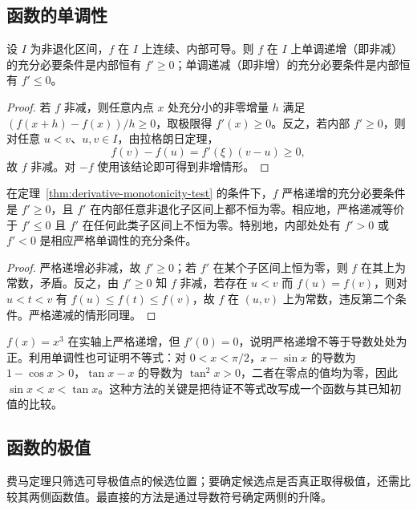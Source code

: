 \documentclass[UTF8,12pt,a4paper,fontset=fandol]{ctexbook}
\begin{document}
\subsection{函数的单调性}
\label{subsec:derivative-tests-for-monotonicity}

\begin{theorem}[单调性的导数判别]
\label{thm:derivative-monotonicity-test}
设 $I$ 为非退化区间，$f$ 在 $I$ 上连续、内部可导。则 $f$ 在 $I$ 上单调递增（即非减）的充分必要条件是内部恒有 $f'\geq0$；单调递减（即非增）的充分必要条件是内部恒有 $f'\leq0$。
\end{theorem}

\begin{proof}
若 $f$ 非减，则任意内点 $x$ 处充分小的非零增量 $h$ 满足 $(f(x+h)-f(x))/h\geq0$，取极限得 $f'(x)\geq0$。反之，若内部 $f'\geq0$，则对任意 $u<v$、$u,v\in I$，由拉格朗日定理，
\[
    f(v)-f(u)=f'(\xi)(v-u)\geq0,
\]
故 $f$ 非减。对 $-f$ 使用该结论即可得到非增情形。
\end{proof}

\begin{corollary}[严格单调的判据]
\label{cor:strict-monotonicity-test}
在定理~\ref{thm:derivative-monotonicity-test} 的条件下，$f$ 严格递增的充分必要条件是 $f'\geq0$，且 $f'$ 在内部任意非退化子区间上都不恒为零。相应地，严格递减等价于 $f'\leq0$ 且 $f'$ 在任何此类子区间上不恒为零。特别地，内部处处有 $f'>0$ 或 $f'<0$ 是相应严格单调性的充分条件。
\end{corollary}

\begin{proof}
严格递增必非减，故 $f'\geq0$；若 $f'$ 在某个子区间上恒为零，则 $f$ 在其上为常数，矛盾。反之，由 $f'\geq0$ 知 $f$ 非减，若存在 $u<v$ 而 $f(u)=f(v)$，则对 $u<t<v$ 有 $f(u)\leq f(t)\leq f(v)$，故 $f$ 在 $(u,v)$ 上为常数，违反第二个条件。严格递减的情形同理。
\end{proof}

$f(x)=x^3$ 在实轴上严格递增，但 $f'(0)=0$，说明严格递增不等于导数处处为正。利用单调性也可证明不等式：对 $0<x<\pi/2$，$x-\sin x$ 的导数为 $1-\cos x>0$，$\tan x-x$ 的导数为 $\tan^2x>0$，二者在零点的值均为零，因此 $\sin x<x<\tan x$。这种方法的关键是把待证不等式改写成一个函数与其已知初值的比较。

\subsection{函数的极值}
\label{subsec:extrema-of-functions}

费马定理只筛选可导极值点的候选位置；要确定候选点是否真正取得极值，还需比较其两侧函数值。最直接的方法是通过导数符号确定两侧的升降。
\end{document}
